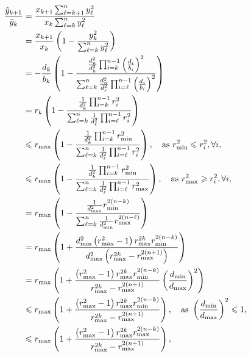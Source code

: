 \documentclass[11pt]{article}
\begin{document}
\begin{align*}
    \frac{\tilde{y}_{k+1}}
        {\tilde{y}_k}
        &=\frac{x_{k+1} \sum_{\ell=k+1}^n y_\ell^2}
            {x_k \sum_{\ell=k}^n y_\ell^2}\\
        &=\frac{x_{k+1}}{x_k} 
            \left(1-
            \frac{y_k^2}
            {\sum_{\ell=k}^n y_\ell^2}\right)\\
        &=-\frac{d_k}{b_k} 
            \left(1- 
            \frac{\frac{d_n^2}{d_k^2} \prod_{i=k}^{n-1}\left(\frac{d_i}{b_i}\right)^2}
            {\sum_{\ell=k}^n \frac{d_n^2}{d_\ell^2} \prod_{i=\ell}^{n-1}\left(\frac{d_i}{b_i}\right)^2}\right) \\
        &=r_k\left(1-
            \frac{\frac{1}{d_k^2} \prod_{i=k}^{n-1} r_i^2}
            { \sum_{\ell=k}^n \frac{1}{d_\ell^2} \prod_{i=\ell}^{n-1} r_i^2 } \right)\\
        &\leqslant r_{\max }\left(1-
            \frac{\frac{1}{d_k^2} \prod_{i=k}^{n-1} r_{\min }^2}
            {\sum_{\ell=k}^n \frac{1}{d_\ell^2} \prod_{i=\ell}^{n-1} r_{i }^2 }\right) \qc
            \text{as } r_{\min }^2 \leqslant r_i^2, \forall i,\\
        &\leqslant r_{\max }\left(1-
            \frac{\frac{1}{d_k^2} \prod_{i=k}^{n-1} r_{\min }^2}
            {\sum_{\ell=k}^n \frac{1}{d_\ell^2} \prod_{i=\ell}^{n-1} r_{\max }^2 }\right) \qc
            \text{as } r_{\max }^2 \geqslant r_i^2, \forall i,\\
        &=r_{\max }\left(1-\frac{\frac{1}{d_{\max }^2} r_{\min }^{2(n-k)}}{\sum_{\ell=k}^n \frac{1}{d_{\min }^2} r_{\max }^{2(n-\ell)}}\right)\\
        &=r_{\max }\left(1+\frac{d_{\min}^2\left(r_{\max }^2-1\right) r_{\max }^{2 k} r_{\min }^{2(n-k)}}{d_{\max }^2\left(r_{\max }^{2 k}-r_{\max }^{2(n+1)}\right)}\right)\\
        &=r_{\max }\left(1+\frac{\left(r_{\max }^2-1\right) r_{\max }^{2 k} r_{\min }^{2(n-k)}}{r_{\max }^{2 k}-r_{\max }^{2(n+1)}} \left(\frac{d_{\min }}{d_{\max }}\right)^2\right)\\
        &\leqslant r_{\max }\left(1+
            \frac{\left(r_{\max }^2-1\right) r_{\max }^{2 k} r_{\min }^{2(n-k)}}
            {r_{\max }^{2 k}-r_{\max }^{2(n+1)}} \right) \qc
            \text{as } \left(\frac{d_{\min }}{d_{\max }}\right)^2 \leqslant 1,\\
        &\leqslant r_{\max }\left(1+
            \frac{\left(r_{\max }^2-1\right) r_{\max }^{2 k} r_{\max }^{2(n-k)}}
            {r_{\max }^{2 k}-r_{\max }^{2(n+1)}} \right) \qc

\end{align*}
\end{document}
